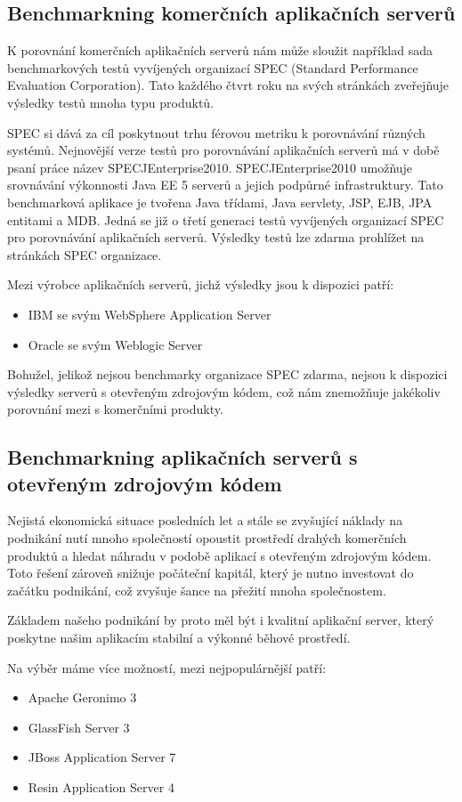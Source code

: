 \documentclass[122pt,oneside]{fithesis}
\begin{document}
\subsection{Benchmarkning komerčních aplikačních serverů}
K porovnání komerčních aplikačních serverů nám může  sloužit například sada benchmarkových testů vyvíjených organizací SPEC (Standard Performance Evaluation Corporation). Tato každého čtvrt roku na svých stránkách zveřejňuje výsledky testů mnoha typu produktů.

SPEC si dává za cíl poskytnout trhu férovou metriku k porovnávání různých systémů. Nejnovější verze testů pro porovnávání aplikačních serverů má v době psaní práce název SPECJEnterprise2010. SPECJEnterprise2010 umožňuje srovnávání výkonnosti Java EE 5 serverů a jejich podpůrné infrastruktury. Tato benchmarková aplikace je tvořena Java třídami, Java servlety, JSP, EJB, JPA entitami a MDB. Jedná se již o třetí generaci testů vyvíjených organizací SPEC pro porovnávání aplikačních serverů. Výsledky testů lze zdarma prohlížet na stránkách SPEC organizace.

Mezi výrobce aplikačních serverů, jichž výsledky jsou k dispozici patří:
\begin{itemize}
  \item IBM se svým WebSphere Application Server
  \item Oracle se svým Weblogic Server
\end{itemize}
Bohužel, jelikož nejsou benchmarky organizace SPEC zdarma, nejsou k dispozici výsledky serverů s otevřeným zdrojovým kódem, což nám znemožňuje jakékoliv porovnání mezi s komerčními produkty.

\subsection{Benchmarkning aplikačních serverů s otevřeným zdrojovým kódem}
Nejistá ekonomická situace posledních let a stále se zvyšující náklady na podnikání nutí mnoho společností opoustit prostředí drahých komerčních produktů a hledat náhradu v podobě aplikací s otevřeným zdrojovým kódem. Toto řešení zároveň snižuje počáteční kapitál, který je nutno investovat do začátku podnikání, což zvyšuje šance na přežití mnoha společnostem.

Základem našeho podnikání by proto měl být i kvalitní aplikační server, který poskytne našim aplikacím stabilní a výkonné běhové prostředí.

Na výběr máme více možností, mezi nejpopulárnější patří:
\begin{itemize}
  \item Apache Geronimo 3
  \item GlassFish Server 3
  \item JBoss Application Server 7
  \item Resin Application Server 4
\end{itemize}
\end{document}
